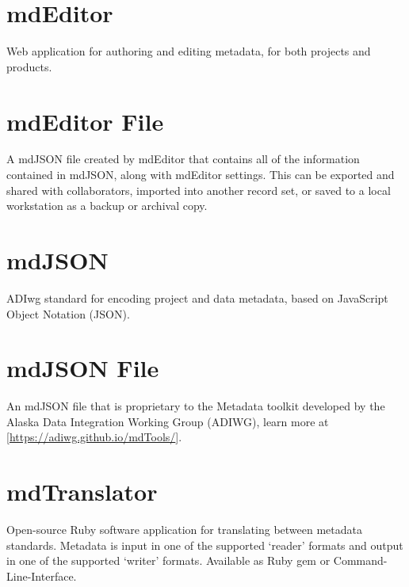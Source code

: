 \documentclass[
]{book}
\begin{document}
\hypertarget{mdeditor}{%
\section*{mdEditor}\label{mdeditor}}

Web application for authoring and editing metadata, for both projects and products.

\hypertarget{mdeditor-file}{%
\section*{mdEditor File}\label{mdeditor-file}}

A mdJSON file created by mdEditor that contains all of the information contained in mdJSON, along with mdEditor settings. This can be exported and shared with collaborators, imported into another record set, or saved to a local workstation as a backup or archival copy.

\hypertarget{mdjson}{%
\section*{mdJSON}\label{mdjson}}

ADIwg standard for encoding project and data metadata, based on JavaScript Object Notation (JSON).

\hypertarget{mdjson-file}{%
\section*{mdJSON File}\label{mdjson-file}}

An mdJSON file that is proprietary to the Metadata toolkit developed by the Alaska Data Integration Working Group (ADIWG), learn more at {[}\url{https://adiwg.github.io/mdTools/}{]}.

\hypertarget{mdtranslator}{%
\section*{mdTranslator}\label{mdtranslator}}

Open-source Ruby software application for translating between metadata standards. Metadata is input in one of the supported `reader' formats and output in one of the supported `writer' formats. Available as Ruby gem or Command-Line-Interface.
\end{document}
